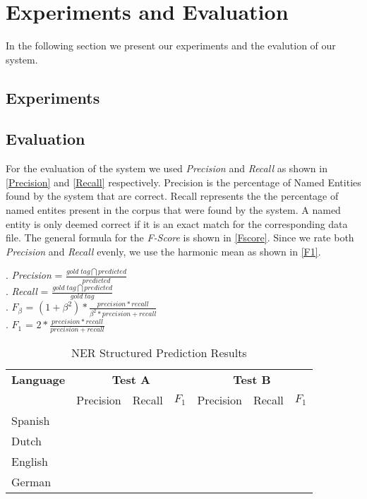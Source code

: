 \documentclass[11pt]{article}
\begin{document}
\section{Experiments and Evaluation}
In the following section we present our experiments and the evalution of our system.
\subsection*{Experiments}


\subsection*{Evaluation}
For the evaluation of the system we used \emph{Precision} and \emph{Recall} as shown in \ref{Precision} and \ref{Recall} respectively.
Precision is the percentage of Named Entities found by the system that are correct. Recall represents the the percentage of 
named entites present in the corpus that were found by the system. 
A named entity is only deemed correct if it is an exact match for the corresponding data file.
The general formula for the \emph{F-Score} is shown in \ref{Fscore}. Since we rate both \emph{Precision} and \emph{Recall} evenly, we 
use the harmonic mean as shown in \ref{F1}.


\ex. \emph{Precision} = $ \frac{gold\; tag \bigcap predicted}{predicted}$ \label{Precision}\\


\ex. \emph{Recall} = $ \frac{gold \;tag \bigcap predicted}{gold\; tag}$ \label{Recall}\\


\ex. $F_{\beta}$ = $ (1+\beta^2)*\frac{precision *recall}{\beta^2* precision + recall}$ \label{Fscore}\\

\ex. $F_1$ = $ 2*\frac{precision *recall}{precision + recall}$ \label{F1}\\




\begin{table*}[t]
\centering
\begin{tabular}{| l | l l l| l l l |}

\hline
\bf Language & \multicolumn{3}{c|}{ \bf Test A}&\multicolumn{3}{c|}{ \bf Test B}\\
             & Precision & Recall & $F_1$ & Precision & Recall & $F_1$ \\ \hline
Spanish &       &          &     &          &               & \\
Dutch  &         &          &     &          &               &   \\
English &        &          &     &          &               &       \\
German &      &          &       &          &             & \\
\hline
\end{tabular}
\caption{NER Structured Prediction Results }
\label{table:Results}
\end{table*}
\end{document}
